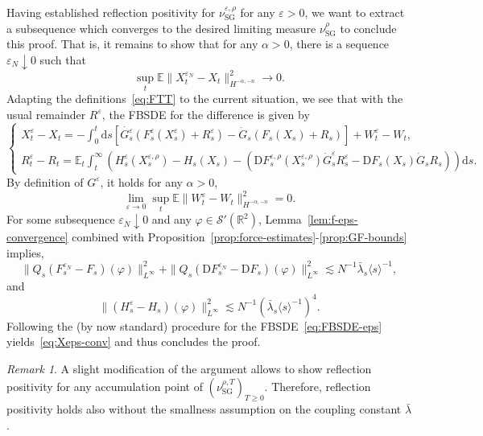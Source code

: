\documentclass[11pt, a4paper]{scrartcl}
\numberwithin{equation}{section}
\theoremstyle{plain}
\theoremstyle{remark}
\newtheorem{remark}[foo]{Remark}
\newcommand{\mathD}{\mathrm{D}}
\newcommand{\mathd}{\mathrm{d}}
\newcommand{\tmop}[1]{\ensuremath{\operatorname{#1}}}
\begin{document}
Having established reflection positivity for $\nu_{\tmop{SG}}^{\varepsilon,
\rho}$ for any $\varepsilon > 0$, we want to extract a subsequence which
converges to the desired limiting measure $\nu_{\tmop{SG}}^{\rho}$ to conclude
this proof. That is, it remains to show that for any $\alpha > 0$, there is a
sequence $\varepsilon_N \downarrow 0$ such that
\begin{equation}
  \sup_t \mathbb{E} \| X_t^{\varepsilon_N} - X_t \|^2_{H^{- \alpha, - n}}
  \rightarrow 0. \label{eq:Xeps-conv}
\end{equation}
Adapting the definitions~\eqref{eq:FTT} to the current situation, we see that
with the usual remainder $R^{\varepsilon}$, the FBSDE for the difference is
given by
\begin{equation}
  \begin{cases}
    X_t^{\varepsilon} - X_t = - \int_0^t \mathd s [\dot{G_s^{\varepsilon}}
    (F_s^{\varepsilon} (X_s^{\varepsilon}) + R_s^{\varepsilon}) - \dot{G}_s
    (F_s (X_s) + R_s)] + W^{\varepsilon}_t - W_t,\\
    R_t^{\varepsilon} - R_t = \mathbb{E}_t\int_t^{\infty} 
    (H^{\varepsilon}_s (X^{\varepsilon, \rho}_s) - H_s (X_s)-(\mathD F_s^{\varepsilon, \rho}
    (X^{\varepsilon, \rho}_s)  \dot{G}^{\varepsilon}_s R^{\varepsilon}_s - \mathD
    F_s (X_s)  \dot{G}_s R_s))\mathd s.
  \end{cases} \label{eq:FBSDE-eps}
\end{equation}
By definition of $G^{\varepsilon}$, it holds for any $\alpha > 0$,
\[ \lim_{\varepsilon \rightarrow 0} \sup_t \mathbb{E} \| W^{\varepsilon}_t -
   W_t \|_{H^{- \alpha, - n}}^2 = 0. \]
For some subsequence $\varepsilon_N \downarrow 0$ and any $\varphi \in
\mathcal{S}' (\mathbb{R}^2)$, Lemma~\ref{lem:f-eps-convergence} combined with
Proposition~\ref{prop:force-estimates}-\ref{prop:GF-bounds} implies,
\[ \| Q_s (F_s^{\varepsilon_N} - F_s) (\varphi) \|_{L^{\infty}}^2 + \| Q_s
   (\mathD F_s^{\varepsilon_N} - \mathD F_s) (\varphi) \|_{L^{\infty}}^2
   \lesssim N^{- 1} \bar{\lambda}_s \langle s \rangle^{- 1}, \]
and
\[ \| (H^{\varepsilon}_s - H_s) (\varphi) \|_{L^{\infty}}^2 \lesssim N^{- 1}
   (\bar{\lambda}_s \langle s \rangle^{- 1})^4 . \]
Following the (by now standard) procedure for the FBSDE~\eqref{eq:FBSDE-eps}
yields~\eqref{eq:Xeps-conv} and thus concludes the proof.

\begin{remark}
  A slight modification of the argument allows to show reflection positivity
  for any accumulation point of $(\nu_{\tmop{SG}}^{\rho, T})_{T \geqslant 0}$.
  Therefore, reflection positivity holds also without the smallness assumption
  on the coupling constant $\bar{\lambda}$.
\end{remark}
\end{document}
